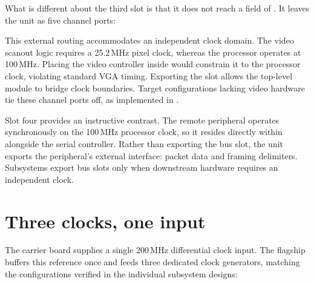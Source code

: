 \documentclass[journal,9pt]{IEEEtran}
\begin{document}
\begin{table}[htbp]
\caption{The flagship's address map, lowest first, as the core's
router decodes it.}
\label{tab:f-map}
\end{table}

\begin{table}[htbp]
\caption{The peripheral page at , as its bridge decodes
it.}
\label{tab:f-page}
\end{table}

\begin{table}[tbp]
\caption{The video peripheral's registers, on the third slot.}
\label{tab:f-hdmi}
\end{table}

What is different about the third slot is that it does not reach a
field of . It leaves the unit as five channel ports:



This external routing accommodates an independent clock domain. The video
scanout logic requires a 25.2\,MHz pixel clock, whereas the processor operates
at 100\,MHz. Placing the video controller inside  would constrain
it to the processor clock, violating standard VGA timing. Exporting the slot
allows the top-level module to bridge clock boundaries. Target configurations
lacking video hardware tie these channel ports off, as implemented in
.

Slot four provides an instructive contrast. The remote peripheral operates
synchronously on the 100\,MHz processor clock, so it resides directly within
 alongside the serial controller. Rather than exporting the bus
slot, the unit exports the peripheral's external interface: packet data and
framing delimiters. Subsystems export bus slots only when downstream hardware
requires an independent clock.

\section{Three clocks, one input}
\label{sec:f-clocks}

The carrier board supplies a single 200\,MHz differential clock input. The
flagship buffers this reference once and feeds three dedicated clock generators,
matching the configurations verified in the individual subsystem designs:
\end{document}
